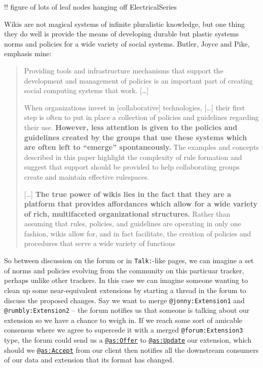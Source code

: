 \documentclass[10pt]{article}
\begin{document}
\begin{multicols}{2}
!! figure of lots of leaf nodes hanging off ElectricalSeries

Wikis are not magical systems of infinite pluralistic knowledge, but one
thing they do well is provide the means of developing durable but
plastic systems norms and policies for a wide variety of social systems.
Butler, Joyce and Pike, emphasis mine:

\begin{quote}
Providing tools and infrastructure mechanisms that support the
development and management of policies is an important part of creating
social computing systems that work. {[}\ldots{]}

When organizations invest in {[}collaborative{]} technologies,
{[}\ldots{]} their first step is often to put in place a collection of
policies and guidelines regarding their use. \textbf{However, less
attention is given to the policies and guidelines created by the groups
that use these systems which are often left to ``emerge''
spontaneously.} The examples and concepts described in this paper
highlight the complexity of rule formation and suggest that support
should be provided to help collaborating groups create and maintain
effective rulespaces.

{[}\ldots{]} \textbf{The true power of wikis lies in the fact that they
are a platform that provides affordances which allow for a wide variety
of rich, multifaceted organizational structures.} Rather than assuming
that rules, policies, and guidelines are operating in only one fashion,
wikis allow for, and in fact facilitate, the creation of policies and
procedures that serve a wide variety of functions \cite{butlerDonLookNow2008} 
\end{quote}

So between discussion on the forum or in \texttt{Talk:}-like pages, we
can imagine a set of norms and policies evolving from the community on
this particuar tracker, perhaps unlike other trackers. In this case we
can imagine someone wanting to clean up some near-equivalent extensions
by starting a thread in the forum to discuss the proposed changes. Say
we want to merge \texttt{@jonny:Extension1} and
\texttt{@rumbly:Extension2} -- the forum notifies us that someone is
talking about our extension so we have a chance to weigh in. If we reach
some sort of amicable consensus where we agree to supercede it with a
merged \texttt{@forum:Extension3} type, the forum could send us a
\href{https://www.w3.org/TR/activitystreams-vocabulary/\#dfn-offer}{\texttt{@as:Offer}}
to
\href{https://www.w3.org/TR/activitystreams-vocabulary/\#dfn-update}{\texttt{@as:Update}}
our extension, which should we
\href{https://www.w3.org/TR/activitystreams-vocabulary/\#dfn-accept}{\texttt{@as:Accept}}
from our client then notifies all the downstream consumers of our data
and extension that its format has changed.


\end{multicols}
\end{document}
